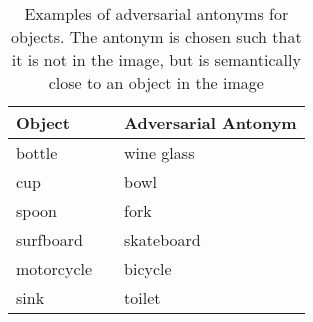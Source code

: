 \begin{table}[t]
    \centering
    \caption{Examples of adversarial antonyms for objects.
    The antonym is chosen such that it is not in the image, but is semantically close to an object in the image}
    \begin{tabular}{lll} %
        \toprule
      \textbf{ Object} & \phantom{abcde} & \textbf{Adversarial Antonym} \\
      \toprule 
        bottle  && wine glass    \\
        cup     && bowl          \\
        spoon   && fork          \\
        surfboard && skateboard  \\
        motorcycle && bicycle \\
        sink && toilet \\
         \bottomrule
    \end{tabular}
    \label{tab:antonyms}
\end{table}
